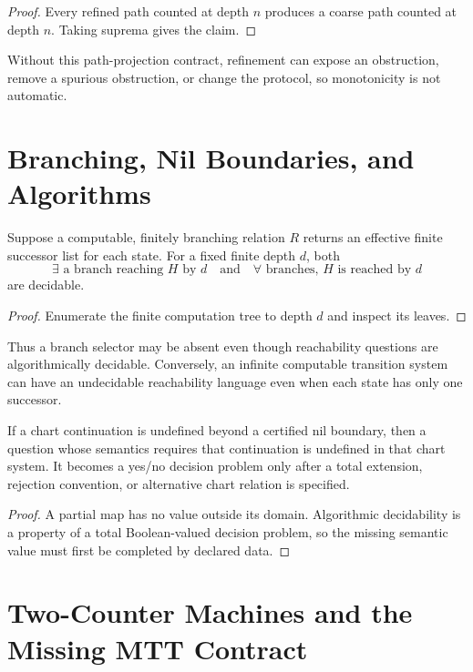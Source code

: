 \documentclass[11pt]{article}
\begin{document}
\begin{proof}
Every refined path counted at depth $n$ produces a coarse path counted at
depth $n$.  Taking suprema gives the claim.
\end{proof}

Without this path-projection contract, refinement can expose an obstruction,
remove a spurious obstruction, or change the protocol, so monotonicity is not
automatic.

\section{Branching, Nil Boundaries, and Algorithms}

\begin{proposition}\label{prop:branch}
Suppose a computable, finitely branching relation $R$ returns an effective
finite successor list for each state.  For a fixed finite depth $d$, both
\[
\exists\text{ a branch reaching }H\text{ by }d
\quad\text{and}\quad
\forall\text{ branches, }H\text{ is reached by }d
\]
are decidable.
\end{proposition}

\begin{proof}
Enumerate the finite computation tree to depth $d$ and inspect its leaves.
\end{proof}

Thus a branch selector may be absent even though reachability questions are
algorithmically decidable.  Conversely, an infinite computable transition
system can have an undecidable reachability language even when each state has
only one successor.

\begin{proposition}\label{prop:nil}
If a chart continuation is undefined beyond a certified nil boundary, then a
question whose semantics requires that continuation is undefined in that
chart system.  It becomes a yes/no decision problem only after a total
extension, rejection convention, or alternative chart relation is specified.
\end{proposition}

\begin{proof}
A partial map has no value outside its domain.  Algorithmic decidability is a
property of a total Boolean-valued decision problem, so the missing semantic
value must first be completed by declared data.
\end{proof}

\section{Two-Counter Machines and the Missing MTT Contract}
\end{document}
